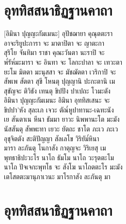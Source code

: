 \chapter{อุททิสสนาธิฏฐานคาถา}
\begin{leader}
\end{leader}

[อิมินา ปุญญะกัมเมนะ] อุปัชฌายา คุณุตตะรา\\
อาจะริยูปะการา จะ มาตาปิตา จะ ญาตะกา\\
สุริโย จันทิมา ราชา คุณะวันตา นะราปิ จะ\\
พ๎รัห๎มะมารา จะ อินทา จะ โลกะปาลา จะ เทวะตา\\
ยะโม มิตตา มะนุสสา จะ มัชฌัตตา เวริกาปิ จะ\\
สัพเพ สัตตา สุขี โหนตุ ปุญญานิ ปะกะตานิ เม\\
สุขัญจะ ติวิธัง เทนตุ ขิปปัง ปาเปถะ โวมะตัง\\
อิมินา ปุญญะกัมเมนะ อิมินา อุททิสเสนะ จะ\\
ขิปปา’หัง สุละเภ เจวะ ตัณ๎หูปาทานะ-เฉทะนัง\\
เย สันตาเน หีนา ธัมมา ยาวะ นิพพานะโต มะมัง\\
นัสสันตุ สัพพะทา เยวะ ยัตถะ ชาโต ภะเว ภะเว\\
อุชุจิตตัง สะติปัญญา สัลเลโข วิริยัม๎หินา\\
มารา ละภันตุ โนกาสัง กาตุญจะ วิริเยสุ เม\\
พุทธาธิปะวะโร นาโถ ธัมโม นาโถ วะรุตตะโม\\
นาโถ ปัจเจกะพุทโธ จะ สังโฆ นาโถตตะโร มะมัง\\
เตโสตตะมานุภาเวนะ มาโรกาสัง ละภันตุ มา\\

\chapter{อุททิสสนาธิฏฐานคาถา}

\begin{leader}
\end{leader}

